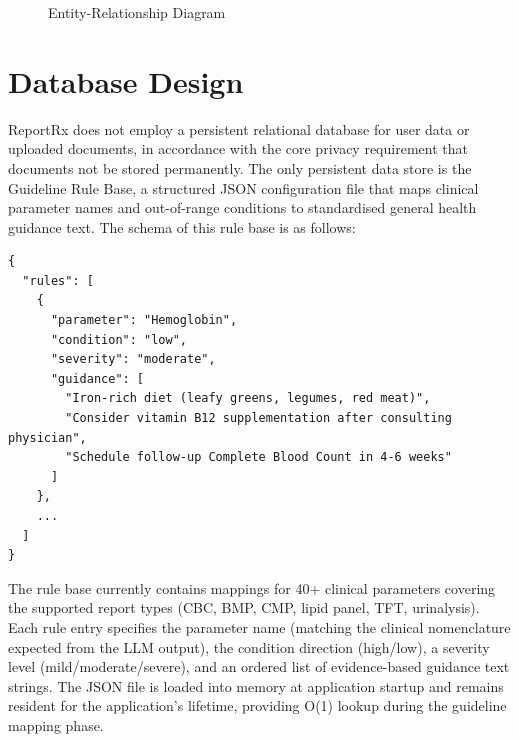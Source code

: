 \documentclass[12pt,a4paper]{report}
\begin{document}
\begin{figure}[h]
    \centering
    \caption{Entity-Relationship Diagram}
\end{figure}

\section{Database Design}
ReportRx does not employ a persistent relational database for user data or uploaded documents, in accordance with the core privacy requirement that documents not be stored permanently. The only persistent data store is the Guideline Rule Base, a structured JSON configuration file that maps clinical parameter names and out-of-range conditions to standardised general health guidance text. The schema of this rule base is as follows:

\begin{verbatim}
{
  "rules": [
    {
      "parameter": "Hemoglobin",
      "condition": "low",
      "severity": "moderate",
      "guidance": [
        "Iron-rich diet (leafy greens, legumes, red meat)",
        "Consider vitamin B12 supplementation after consulting physician",
        "Schedule follow-up Complete Blood Count in 4-6 weeks"
      ]
    },
    ...
  ]
}
\end{verbatim}

The rule base currently contains mappings for 40+ clinical parameters covering the supported report types (CBC, BMP, CMP, lipid panel, TFT, urinalysis). Each rule entry specifies the parameter name (matching the clinical nomenclature expected from the LLM output), the condition direction (high/low), a severity level (mild/moderate/severe), and an ordered list of evidence-based guidance text strings. The JSON file is loaded into memory at application startup and remains resident for the application's lifetime, providing O(1) lookup during the guideline mapping phase.
\end{document}
